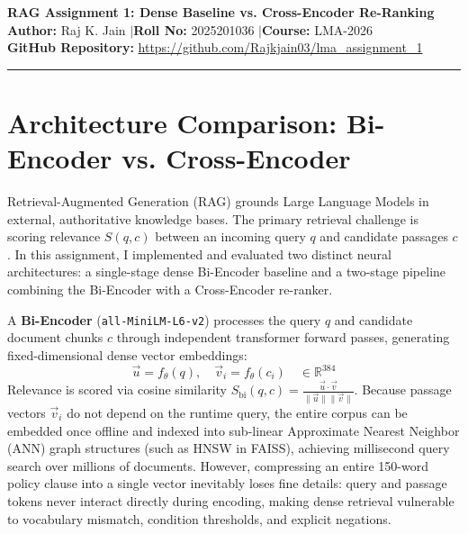 \documentclass[11pt,a4paper]{article}
\begin{document}
\begin{center}
    {\Large \textbf{RAG Assignment 1: Dense Baseline vs. Cross-Encoder Re-Ranking}}\\[0.3ex]
    {\normalsize \textbf{Author:} Raj K. Jain \quad$\vert$\quad \textbf{Roll No:} 2025201036 \quad$\vert$\quad \textbf{Course:} LMA-2026}\\[0.3ex]
    \textbf{GitHub Repository:} \url{https://github.com/Rajkjain03/lma_assignment_1}
\end{center}

\vspace{-0.7em}
\noindent\rule{\linewidth}{0.5pt}
\vspace{0.2em}

\section{Architecture Comparison: Bi-Encoder vs. Cross-Encoder}

Retrieval-Augmented Generation (RAG) grounds Large Language Models in external, authoritative knowledge bases. The primary retrieval challenge is scoring relevance $S(q, c)$ between an incoming query $q$ and candidate passages $c$. In this assignment, I implemented and evaluated two distinct neural architectures: a single-stage dense Bi-Encoder baseline and a two-stage pipeline combining the Bi-Encoder with a Cross-Encoder re-ranker.

A \textbf{Bi-Encoder} (\texttt{all-MiniLM-L6-v2}) processes the query $q$ and candidate document chunks $c$ through independent transformer forward passes, generating fixed-dimensional dense vector embeddings:
\begin{equation}
    \vec{u} = f_\theta(q), \quad \vec{v}_i = f_\theta(c_i) \quad \in \mathbb{R}^{384}
\end{equation}
Relevance is scored via cosine similarity $S_{\text{bi}}(q, c) = \frac{\vec{u} \cdot \vec{v}}{\|\vec{u}\| \|\vec{v}\|}$. Because passage vectors $\vec{v}_i$ do not depend on the runtime query, the entire corpus can be embedded once offline and indexed into sub-linear Approximate Nearest Neighbor (ANN) graph structures (such as HNSW in FAISS), achieving millisecond query search over millions of documents. However, compressing an entire 150-word policy clause into a single vector inevitably loses fine details: query and passage tokens never interact directly during encoding, making dense retrieval vulnerable to vocabulary mismatch, condition thresholds, and explicit negations.
\end{document}
